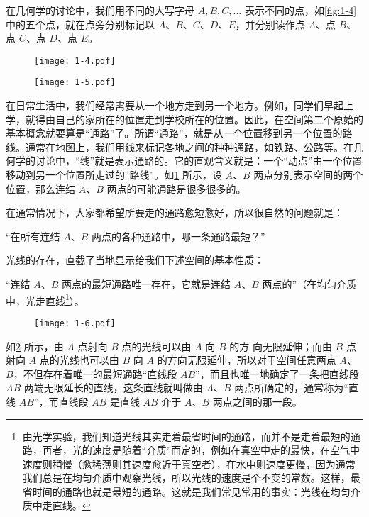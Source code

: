 在几何学的讨论中，我们用不同的大写字母 $A,B,C,\ldots$ 表示不同的点，如\cref{fig:1-4} 中的五个点，就在点旁分别标记以 $A$、$B$、$C$、$D$、$E$，并分别读作点 $A$、点 $B$、点 $C$、点 $D$、点 $E$。

\begin{figure}
  \begin{minipage}[b]{0.48\linewidth}
    \centering
		\texttt{[image: 1-4.pdf]}
    \caption{}\label{fig:1-4}
  \end{minipage}
  \begin{minipage}[b]{0.48\linewidth}
    \centering
    \texttt{[image: 1-5.pdf]}
    \caption{}\label{fig:1-5}
  \end{minipage}
\end{figure}


在日常生活中，我们经常需要从一个地方走到另一个地方。例如，同学们早起上学，就得由自己的家所在的位置走到学校所在的位置。因此，在空间第二个原始的基本概念就要算是“通路”了。所谓“通路”，就是从一个位置移到另一个位置的路线。通常在地图上，我们用线来标记各地之间的种种通路，如铁路、公路等。在几何学的讨论中，“线”就是表示通路的。它的直观含义就是：一个“动点”由一个位置移动到另一个位置所走过的“路线”。如\cref{fig:1-5} 所示，设 $A$、$B$ 两点分别表示空间的两个位置，那么连结 $A$、$B$ 两点的可能通路是很多很多的。

在通常情况下，大家都希望所要走的通路愈短愈好，所以很自然的问题就是：

“在所有连结 $A$、$B$ 两点的各种通路中，哪一条通路最短？”

光线的存在，直截了当地显示给我们下述空间的基本性质：

“连结 $A$、$B$ 两点的最短通路唯一存在，它就是连结 $A$、$B$ 两点的”（在均匀介质中，光走直线\footnote{由光学实验，我们知道光线其实走着最省时间的通路，而并不是走着最短的通路，再者，光的速度是随着“介质”而定的，例如在真空中走的最快，在空气中速度则稍慢（愈稀薄则其速度愈近于真空者），在水中则速度更慢，因为通常我们总是在均匀介质中观察光线，所以光线的速度是个不变的常数。这样，最省时间的通路也就是最短的通路。这就是我们常见常用的事实：光线在均匀介质中走直线。}）。

\begin{figure}
	\texttt{[image: 1-6.pdf]}
	\caption{}\label{fig:1-6}
\end{figure}


如\cref{fig:1-6} 所示，由 $A$ 点射向 $B$ 点的光线可以由 $A$ 向 $B$ 的方
向无限延伸；而由 $B$ 点射向 $A$ 点的光线也可以由 $B$ 向 $A$ 的方向无限延伸，所以对于空间任意两点 $A$、$B$，不但存在着唯一的最短通路“直线段 $AB$”，而且也唯一地确定了一条把直线段 $AB$ 两端无限延长的直线，这条直线就叫做由 $A$、$B$ 两点所确定的，通常称为“直线 $AB$”，而直线段 $AB$ 是直线 $AB$ 介于 $A$、$B$ 两点之间的那一段。

